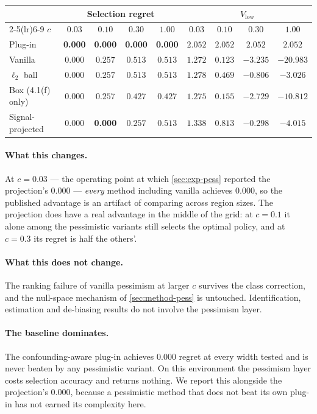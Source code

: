 \begin{center}
\begin{tabular}{lcccccccc}
\toprule
& \multicolumn{4}{c}{Selection regret} & \multicolumn{4}{c}{$V_{\mathrm{low}}$} \\
\cmidrule(lr){2-5}\cmidrule(lr){6-9}
$c$ & $0.03$ & $0.10$ & $0.30$ & $1.00$ & $0.03$ & $0.10$ & $0.30$ & $1.00$ \\
\midrule
Plug-in             & \textbf{0.000} & \textbf{0.000} & \textbf{0.000} & \textbf{0.000} & $2.052$ & $2.052$ & $2.052$ & $2.052$ \\
Vanilla             & $0.000$ & $0.257$ & $0.513$ & $0.513$ & $1.272$ & $0.123$ & $-3.235$ & $-20.983$ \\
$\ell_2$ ball       & $0.000$ & $0.257$ & $0.513$ & $0.513$ & $1.278$ & $0.469$ & $-0.806$ & $-3.026$ \\
Box (4.1(f) only)   & $0.000$ & $0.257$ & $0.427$ & $0.427$ & $1.275$ & $0.155$ & $-2.729$ & $-10.812$ \\
Signal-projected    & $0.000$ & \textbf{0.000} & $0.257$ & $0.513$ & $1.338$ & $0.813$ & $-0.298$ & $-4.015$ \\
\bottomrule
\end{tabular}
\end{center}

\paragraph{What this changes.} At $c{=}0.03$ --- the operating point at which
\cref{sec:exp-pess} reported the projection's $0.000$ --- \emph{every} method
including vanilla achieves $0.000$, so the published advantage is an artifact of
comparing across region sizes. The projection does have a real advantage in the
middle of the grid: at $c{=}0.1$ it alone among the pessimistic variants still
selects the optimal policy, and at $c{=}0.3$ its regret is half the others'.

\paragraph{What this does not change.} The ranking failure of vanilla pessimism
at larger $c$ survives the class correction, and the null-space mechanism of
\cref{sec:method-pess} is untouched. Identification, estimation and de-biasing
results do not involve the pessimism layer.

\paragraph{The baseline dominates.} The confounding-aware plug-in achieves
$0.000$ regret at every width tested and is never beaten by any pessimistic
variant. On this environment the pessimism layer costs selection accuracy and
returns nothing. We report this alongside the projection's $0.000$, because a
pessimistic method that does not beat its own plug-in has not earned its
complexity here.
